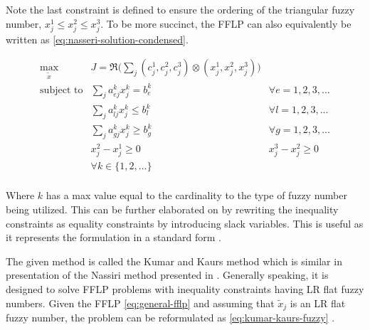 \documentclass[ee,thesis]{usuthesis}
\begin{document}
\noindent Note the last constraint is defined to ensure the ordering of the triangular fuzzy number, \(x_j^1 \le x_j^2 \le x_j^3\).
To be more succinct, the FFLP can also equivalently be written as \ref{eq:nasseri-solution-condensed}.

\begin{equation}
\label{eq:nasseri-solution-condensed}
\begin{array}{llc}
\underset{{\tilde{x}}}{\text{max}} & J = \mathfrak{R}\Big(\sum_j (c_j^1,c_j^2,c_j^3) \otimes (x_j^1,x_j^2,x_j^3)\Big) &\\
\text{subject to} & \sum_j a_{ej}^k x_j^k = b_e^k &  \forall e = 1,2,3,... \\
                  & \sum_j a_{lj}^k x_j^k \le b_l^k &  \forall l = 1,2,3,... \\
                  & \sum_j a_{gj}^k x_j^k \ge b_g^k  &  \forall g = 1,2,3,... \\
                  & x_j^2 - x_j^1 \ge 0         & x_j^3 - x_j^2 \ge 0 \\
                  & \forall k \in \{1,2,...\}        &                  \\
\end{array}
\end{equation}

Where \(k\) has a max value equal to the cardinality to the type of fuzzy number being utilized. This can be further
elaborated on by rewriting the inequality constraints as equality constraints by introducing slack variables. This is
useful as it represents the formulation in a standard form \cite{chen-2010-applied,vanderbei-2020-linear-progr}.

The given method is called the Kumar and Kaurs method \cite{kaur-2016-introd-fuzzy} which is similar in presentation of
the Nassiri method presented in \cite{bello-2019-fuzzy-activ}. Generally speaking, it is designed to solve FFLP
problems with inequality constraints having LR flat fuzzy numbers. Given the FFLP \ref{eq:general-fflp} and assuming that
\(\tilde{x}_j\) is an LR flat fuzzy number, the problem can be reformulated as \ref{eq:kumar-kaurs-fuzzy}
\cite{kaur-2016-introd-fuzzy}.
\end{document}
